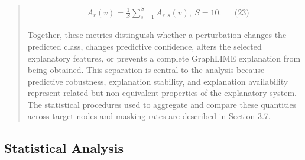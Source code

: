 \documentclass[a4paper]{article}
\begin{document}
\begin{quote}
\[\begin{matrix}
 & {\overline{A}}_{r}(v) = \frac{1}{S}\sum_{s = 1}^{S}A_{r,s}(v),\ S = 10. & & \text{(23)}
\end{matrix}
\]

Together, these metrics distinguish whether a perturbation changes the
predicted class, changes predictive confidence, alters the selected
explanatory features, or prevents a complete GraphLIME explanation from
being obtained. This separation is central to the analysis because
predictive robustness, explanation stability, and explanation
availability represent related but non-equivalent properties of the
explanatory system. The statistical procedures used to aggregate and
compare these quantities across target nodes and masking rates are
described in Section 3.7.
\end{quote}

\subsection{Statistical Analysis}\label{statistical-analysis}
\end{document}
